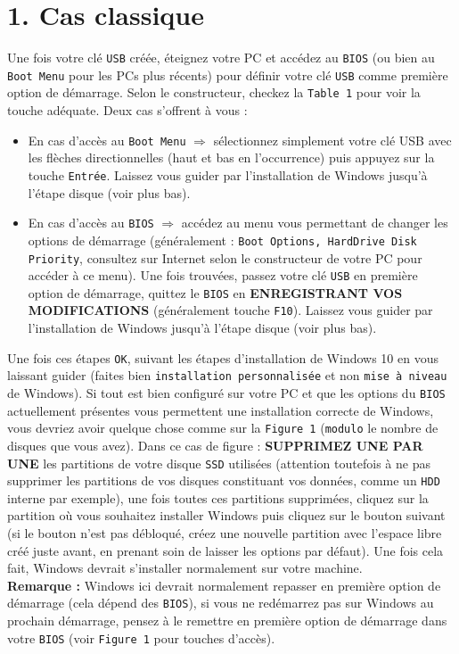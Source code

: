 \documentclass[french, a4paper, 11pt]{article}
\begin{document}
\section*{1. Cas classique}
\noindent Une fois votre clé \texttt{USB} créée, éteignez votre PC et accédez au \texttt{BIOS} (ou bien au \texttt{Boot Menu} pour les PCs plus récents) pour définir votre clé \texttt{USB} comme première option de démarrage. Selon le constructeur, checkez la \texttt{Table 1} pour voir la touche adéquate. Deux cas s'offrent à vous : 
\begin{itemize}
\item En cas d'accès au \texttt{Boot Menu} $\Rightarrow$ sélectionnez simplement votre clé USB avec les flèches directionnelles (haut et bas en l'occurrence) puis appuyez sur la touche \texttt{Entrée}. Laissez vous guider par l'installation de Windows jusqu'à l'étape disque (voir plus bas).
\item En cas d'accès au \texttt{BIOS} $\Rightarrow$ accédez au menu vous permettant de changer les options de démarrage (généralement : \texttt{Boot Options, HardDrive Disk Priority}, consultez sur Internet selon le constructeur de votre PC pour accéder à ce menu). Une fois trouvées, passez votre clé \texttt{USB} en première option de démarrage, quittez le \texttt{BIOS} en \textbf{ENREGISTRANT VOS MODIFICATIONS} (généralement touche \texttt{F10}). Laissez vous guider par l'installation de Windows jusqu'à l'étape disque (voir plus bas).
\end{itemize}
\noindent Une fois ces étapes \texttt{OK}, suivant les étapes d'installation de Windows 10 en vous laissant guider (faites bien \texttt{installation personnalisée} et non \texttt{mise à niveau} de Windows). Si tout est bien configuré sur votre PC et que les options du \texttt{BIOS} actuellement présentes vous permettent une installation correcte de Windows, vous devriez avoir quelque chose comme sur la \texttt{Figure 1} (\texttt{modulo} le nombre de disques que vous avez). Dans ce cas de figure : \textbf{SUPPRIMEZ UNE PAR UNE} les partitions de votre disque \texttt{SSD} utilisées (attention toutefois à ne pas supprimer les partitions de vos disques constituant vos données, comme un \texttt{HDD} interne par exemple), une fois toutes ces partitions supprimées, cliquez sur la partition où vous souhaitez installer Windows puis cliquez sur le bouton suivant (si le bouton n'est pas débloqué, créez une nouvelle partition avec l'espace libre créé juste avant, en prenant soin de laisser les options par défaut). Une fois cela fait, Windows devrait s'installer normalement sur votre machine. \\
\noindent \textbf{Remarque :} Windows ici devrait normalement repasser en première option de démarrage (cela dépend des \texttt{BIOS}), si vous ne redémarrez pas sur Windows au prochain démarrage, pensez à le remettre en première option de démarrage dans votre \texttt{BIOS} (voir \texttt{Figure 1} pour touches d'accès).
\end{document}
